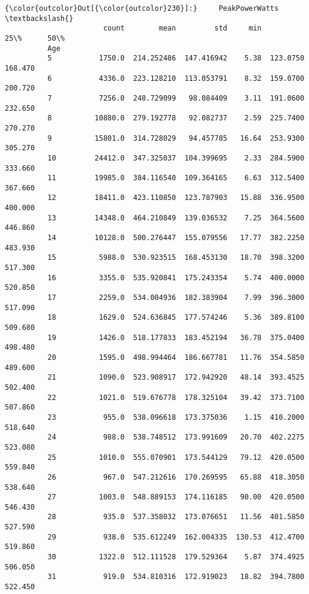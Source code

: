 \documentclass[11pt]{article}
\begin{document}
\begin{Verbatim}[commandchars=\\\{\}]
{\color{outcolor}Out[{\color{outcolor}230}]:}     PeakPowerWatts                                                     \textbackslash{}
                       count        mean         std     min       25\%      50\%   
          Age                                                                     
          5           1750.0  214.252486  147.416942    5.38  123.0750  168.470   
          6           4336.0  223.128210  113.053791    8.32  159.0700  200.720   
          7           7256.0  248.729099   98.084409    3.11  191.0600  232.650   
          8          10880.0  279.192778   92.082737    2.59  225.7400  270.270   
          9          15801.0  314.728029   94.457785   16.64  253.9300  305.270   
          10         24412.0  347.325037  104.399695    2.33  284.5900  333.660   
          11         19985.0  384.116540  109.364165    6.63  312.5400  367.660   
          12         18411.0  423.110850  123.787903   15.88  336.9500  400.000   
          13         14348.0  464.210849  139.036532    7.25  364.5600  446.860   
          14         10128.0  500.276447  155.079556   17.77  382.2250  483.930   
          15          5988.0  530.923515  168.453130   18.70  398.3200  517.300   
          16          3355.0  535.920841  175.243354    5.74  400.0000  520.850   
          17          2259.0  534.004936  182.383904    7.99  396.3000  517.090   
          18          1629.0  524.636845  177.574246    5.36  389.8100  509.680   
          19          1426.0  518.177833  183.452194   36.78  375.0400  498.480   
          20          1595.0  498.994464  186.667781   11.76  354.5850  489.600   
          21          1090.0  523.908917  172.942920   48.14  393.4525  502.400   
          22          1021.0  519.676778  178.325104   39.42  373.7100  507.860   
          23           955.0  538.096618  173.375036    1.15  410.2000  518.640   
          24           988.0  538.748512  173.991609   20.70  402.2275  523.080   
          25          1010.0  555.070901  173.544129   79.12  420.0500  559.840   
          26           967.0  547.212616  170.269595   65.88  418.3050  538.640   
          27          1003.0  548.889153  174.116185   90.00  420.0500  546.430   
          28           935.0  537.358032  173.076651   11.56  401.5850  527.590   
          29           938.0  535.612249  162.004335  130.53  412.4700  519.860   
          30          1322.0  512.111528  179.529364    5.87  374.4925  506.050   
          31           919.0  534.810316  172.919023   18.82  394.7800  522.450   

\end{Verbatim}
\end{document}
